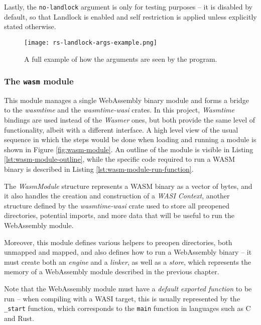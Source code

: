 Lastly, the \texttt{no-landlock} argument is only for testing purposes -- it is disabled by default, so that
Landlock is enabled and self restriction is applied unless explicitly stated otherwise.

\vspace*{0.5cm}
\begin{figure}[ht]
  \centering
  \texttt{[image: rs-landlock-args-example.png]}
  \caption{A full example of how the arguments are seen by the program.}
  \label{fig:args-example}
\end{figure}

\subsubsection{The \texttt{wasm} module}
\label{sec:landlock-wasm-module}

This module manages a single WebAssembly binary module and forms a bridge to the \textit{wasmtime} and the \textit{wasmtime-wasi}
crates. In this project, \textit{Wasmtime} bindings are used instead of the \textit{Wasmer} ones, but both provide the
same level of functionality, albeit with a different interface. A high level view of the usual sequence in which the steps would be done
when loading and running a module is shown in Figure \ref{fig:wasm-module}. An outline of the module is visible
in Listing \ref{lst:wasm-module-outline}, while the specific code required to run a WASM binary is described
in Listing \ref{lst:wasm-module-run-function}.

The \textit{WasmModule} structure represents a WASM binary as a vector of bytes, and it also handles the creation
and construction of a \textit{WASI Context}, another structure defined by the \textit{wasmtime-wasi} crate used to store
all preopened directories, potential imports, and more data that will be useful to run the WebAssembly module.

Moreover, this module defines various helpers to preopen directories, both unmapped and mapped, and
also defines how to run a WebAssembly binary -- it must create both an \textit{engine} and a \textit{linker},
as well as a \textit{store}, which represents the memory of a WebAssembly module described in the previous chapter.

Note that the WebAssembly module must have a \textit{default exported function} to be run -- when compiling with a WASI target,
this is usually represented by the \texttt{\_start} function, which corresponds to the \texttt{main} function in languages
such as C and Rust.

